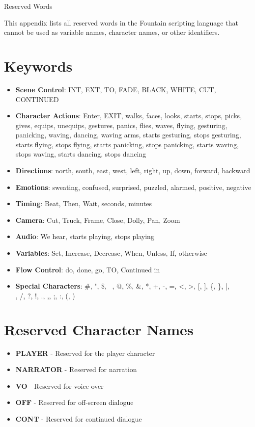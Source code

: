 \documentclass[11pt,letterpaper,oldstylefigures]{memoir}
\makeatletter
\let\oldchapter\chapter
\def\chapter{%
  \@ifstar
    {\FountainScripting@starchapter}%
    {\@dblarg\FountainScripting@chapter}}
\def\FountainScripting@starchapter#1{\oldchapter*{#1}\chaptermark{#1}}
\def\FountainScripting@chapter[#1]#2{\oldchapter[#1]{#2}\chaptermark{#2}}
\makeatother
\begin{document}
\chapter{Reserved Words}
\label{app:reserved-words}

This appendix lists all reserved words in the Fountain scripting language that cannot be used as variable names, character names, or other identifiers.

\section{Keywords}

\begin{itemize}
\item \textbf{Scene Control}: INT, EXT, TO, FADE, BLACK, WHITE, CUT, CONTINUED
\item \textbf{Character Actions}: Enter, EXIT, walks, faces, looks, starts, stops, picks, gives, equips, unequips, gestures, panics, flies, waves, flying, gesturing, panicking, waving, dancing, waving arms, starts gesturing, stops gesturing, starts flying, stops flying, starts panicking, stops panicking, starts waving, stops waving, starts dancing, stops dancing
\item \textbf{Directions}: north, south, east, west, left, right, up, down, forward, backward
\item \textbf{Emotions}: sweating, confused, surprised, puzzled, alarmed, positive, negative
\item \textbf{Timing}: Beat, Then, Wait, seconds, minutes
\item \textbf{Camera}: Cut, Truck, Frame, Close, Dolly, Pan, Zoom
\item \textbf{Audio}: We hear, starts playing, stops playing
\item \textbf{Variables}: Set, Increase, Decrease, When, Unless, If, otherwise
\item \textbf{Flow Control}: do, done, go, TO, Continued in
\item \textbf{Special Characters}: \#, ", \$, ~, @, \%, \&, *, +, -, =, <, >, [, ], \{, \}, |, \\, /, ?, !, ., ,, ;, :, (, )
\end{itemize}

\section{Reserved Character Names}

\begin{itemize}
\item \textbf{PLAYER} - Reserved for the player character
\item \textbf{NARRATOR} - Reserved for narration
\item \textbf{VO} - Reserved for voice-over
\item \textbf{OFF} - Reserved for off-screen dialogue
\item \textbf{CONT} - Reserved for continued dialogue
\end{itemize}
\end{document}
